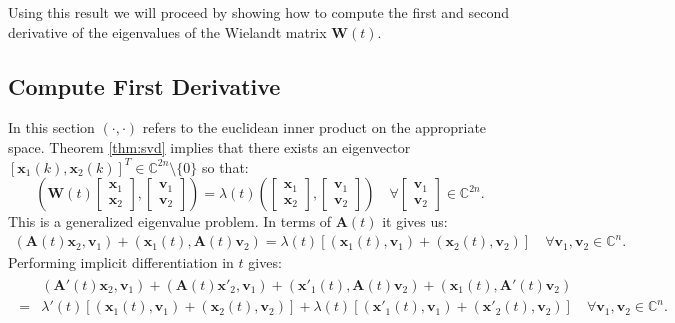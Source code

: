 \documentclass[a4paper, oneside]{thirdparty_stylesheets/discothesis}
\begin{document}
Using this result we will proceed by showing how to compute the first and second derivative of the eigenvalues of the Wielandt matrix $\mathbf{W}(t)$.
\subsection{Compute First Derivative}
In this section $(\cdot,\cdot)$ refers to the euclidean inner product on the appropriate space.
Theorem \ref{thm:svd} implies that there exists an eigenvector $ [\mathbf{x}_1(k), \mathbf{x}_2(k)]^T \in \mathbb{C}^{2n} \setminus \{0\}$ so that:
\begin{equation}
	\left(\mathbf{W}(t)
		\begin{bmatrix}
			\mathbf{x}_1 \\ \mathbf{x}_2
		\end{bmatrix}
		,
		\begin{bmatrix}
			\mathbf{v}_1 \\ \mathbf{v}_2
		\end{bmatrix}
		\right) = \lambda(t) \left(
		\begin{bmatrix}
			\mathbf{x}_1 \\ \mathbf{x}_2
		\end{bmatrix}
		,
		\begin{bmatrix}
			\mathbf{v}_1 \\ \mathbf{v}_2
		\end{bmatrix}
	\right) \quad \forall 
	\begin{bmatrix}
		\mathbf{v}_1 \\ \mathbf{v}_2
	\end{bmatrix}
	\in \mathbb{C}^{2n}.
\end{equation}
This is a generalized eigenvalue problem.
In terms of $\mathbf{A}(t)$ it gives us:
\begin{align}
	(\mathbf{A}(t)\mathbf{x}_2, \mathbf{v}_1) + (\mathbf{x}_1(t),\mathbf{A}(t)\mathbf{v}_2) =\lambda(t)[(\mathbf{x}_1(t),\mathbf{v}_1) + (\mathbf{x}_2(t), \mathbf{v}_2)]
	\quad \forall \mathbf{v}_1, \mathbf{v}_2 \in \mathbb{C}^n.  \label{svder1}
\end{align}
Performing implicit differentiation in $t$ gives:
\begin{align}
	\begin{split}
		&(\mathbf{A}'(t)\mathbf{x}_2, \mathbf{v}_1) + (\mathbf{A}(t)\mathbf{x}'_2, \mathbf{v}_1) + (\mathbf{x}'_1(t),\mathbf{A}(t)\mathbf{v}_2) + (\mathbf{x}_1(t),\mathbf{A}'(t)\mathbf{v}_2) 
		\\ = &\lambda'(t)[(\mathbf{x}_1(t),\mathbf{v}_1) + (\mathbf{x}_2(t), \mathbf{v}_2)] + \lambda(t)[(\mathbf{x}'_1(t),\mathbf{v}_1) + (\mathbf{x}'_2(t), \mathbf{v}_2)]
		\quad \forall \mathbf{v}_1, \mathbf{v}_2 \in \mathbb{C}^n.
	\end{split} \label{svder2}
\end{align}
\end{document}
